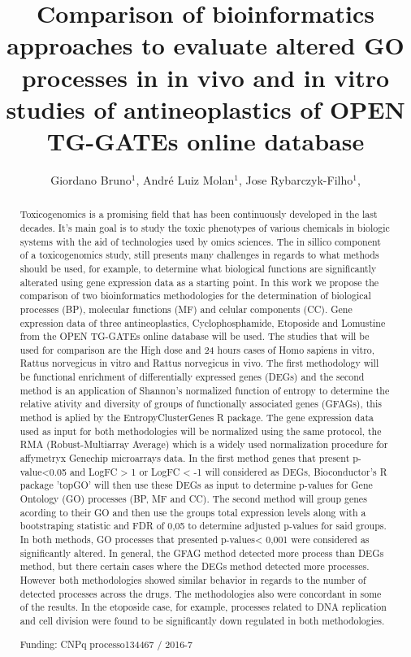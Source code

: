 \documentclass[twoside]{article}
\title{\vspace{-15mm}\fontsize{24pt}{10pt}\selectfont\textbf{ Comparison of bioinformatics approaches to evaluate altered GO processes in in vivo and in vitro studies of antineoplastics of OPEN TG-GATEs online database }} %
\author{ Giordano Bruno$^{1}$, André Luiz Molan$^{1}$, Jose Rybarczyk-Filho$^{1}$, }
\affil{ 1 UNESP

 }
\date{}
\begin{document}
  
  
  \maketitle %
  
  
  \thispagestyle{fancy} %
  
  
  \begin{abstract}
  Toxicogenomics is a promising field that has been continuously developed in the last decades. It's main goal is to study the toxic phenotypes of various chemicals in biologic systems with the aid of technologies used by omics sciences. The in sillico component of a toxicogenomics study, still presents many challenges in regards to what methods should be used, for example, to determine what biological functions are significantly alterated using gene expression data as a starting point. In this work we propose the comparison of two bioinformatics methodologies for the determination of biological processes (BP), molecular functions (MF) and celular components (CC). Gene expression data of three antineoplastics, Cyclophosphamide, Etoposide and Lomustine  from the OPEN TG-GATEs online database will be used. The studies that will be used for comparison are the High dose and 24 hours cases of Homo sapiens in vitro, Rattus norvegicus in vitro and Rattus norvegicus in vivo. The first methodology will be functional enrichment of differentially expressed genes (DEGs) and the second method is an application of Shannon's normalized function of entropy to determine the relative ativity and diversity of groups of functionally associated genes (GFAGs), this method is aplied by the EntropyClusterGenes R package. The gene expression data used as input for both methodologies will be normalized using the same protocol, the RMA (Robust-Multiarray Average) which is a widely used normalization procedure for affymetryx Genechip microarrays data. In the first method genes that present p-value<0.05 and LogFC > 1 or LogFC <  -1 will considered as DEGs, Bioconductor's R package 'topGO' will then use these DEGs as input to determine p-values for Gene Ontology (GO) processes (BP, MF and CC). The second method will group genes acording to their GO and then use the groups total expression levels along with a bootstraping statistic and FDR of 0,05 to determine adjusted p-values for said groups. In both methods, GO processes that presented p-values< 0,001 were considered as significantly altered. In general, the  GFAG method detected more process than DEGs method, but there certain cases where the  DEGs method detected more processes. However both methodologies showed similar behavior in regards to the number of detected processes across the drugs. The methodologies also were concordant in some of the results. In the etoposide case, for example, processes related to DNA replication and cell division were found to be significantly down regulated in both methodologies.
  
  Funding: CNPq processo134467 / 2016-7 \\ 
  \end{abstract}
  
\end{document}
